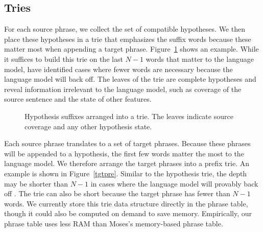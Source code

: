 \documentclass[11pt]{article}
\begin{document}
\subsection{Tries}
\label{contribution}
For each source phrase, we collect the set of compatible hypotheses.  We then place these hypotheses in a trie that emphasizes the suffix words because these matter most when appending a target phrase.  Figure~\ref{hypsuff} shows an example.  While it suffices to build this trie on the last $N-1$ words that matter to the language model,  have identified cases where fewer words are necessary because the language model will back off.  The leaves of the trie are complete hypotheses and reveal information irrelevant to the language model, such as coverage of the source sentence and the state of other features.  

\begin{figure}\centering
{}
\caption{\label{hypsuff}Hypothesis suffixes arranged into a trie.  The leaves indicate source coverage and any other hypothesis state.}
\end{figure}

Each source phrase translates to a set of target phrases.  Because these phrases will be appended to a hypothesis, the first few words matter the most to the language model.  We therefore arrange the target phrases into a prefix trie.  An example is shown in Figure~\ref{tgtpre}.  Similar to the hypothesis trie, the depth may be shorter than $N-1$ in cases where the language model will provably back off \cite{zhifei}.  The trie can also be short because the target phrase has fewer than $N-1$ words.  We currently store this trie data structure directly in the phrase table, though it could also be computed on demand to save memory.  Empirically, our phrase table uses less RAM than Moses's memory-based phrase table.  
\end{document}
